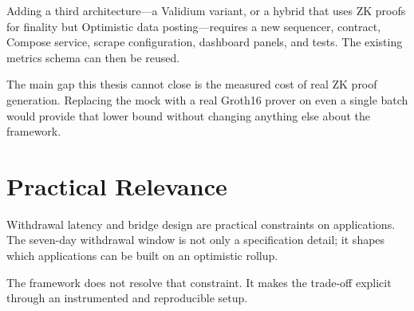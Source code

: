 Adding a third architecture---a Validium variant, or a hybrid that uses ZK proofs for finality but Optimistic data posting---requires a new sequencer, contract, Compose service, scrape configuration, dashboard panels, and tests. The existing metrics schema can then be reused.

The main gap this thesis cannot close is the measured cost of real ZK proof generation. Replacing the mock with a real Groth16 prover on even a single batch would provide that lower bound without changing anything else about the framework.

\section{Practical Relevance}

Withdrawal latency and bridge design are practical constraints on applications. The seven-day withdrawal window is not only a specification detail; it shapes which applications can be built on an optimistic rollup.

The framework does not resolve that constraint. It makes the trade-off explicit through an instrumented and reproducible setup.
